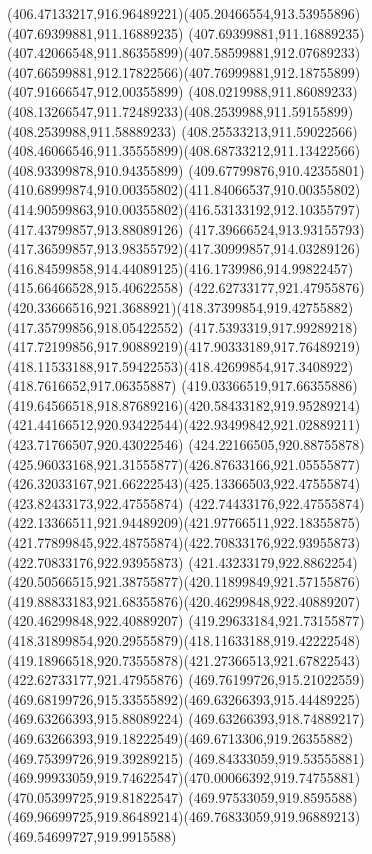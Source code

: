 {{		\curveto(406.47133217,916.96489221)(405.20466554,913.53955896)(407.69399881,911.16889235)
		\curveto(407.69399881,911.16889235)(407.42066548,911.86355899)(407.58599881,912.07689233)
		\curveto(407.66599881,912.17822566)(407.76999881,912.18755899)(407.91666547,912.00355899)
		\curveto(408.0219988,911.86089233)(408.13266547,911.72489233)(408.2539988,911.59155899)
		\lineto(408.2539988,911.58889233)
		\lineto(408.25533213,911.59022566)
		\curveto(408.46066546,911.35555899)(408.68733212,911.13422566)(408.93399878,910.94355899)
		\curveto(409.67799876,910.42355801)(410.68999874,910.00355802)(411.84066537,910.00355802)
		\curveto(414.90599863,910.00355802)(416.53133192,912.10355797)(417.43799857,913.88089126)
		\curveto(417.39666524,913.93155793)(417.36599857,913.98355792)(417.30999857,914.03289126)
		\curveto(416.84599858,914.44089125)(416.1739986,914.99822457)(415.66466528,915.40622558)
		\moveto(422.62733177,921.47955876)
		\curveto(420.33666516,921.3688921)(418.37399854,919.42755882)(417.35799856,918.05422552)
		\curveto(417.5393319,917.99289218)(417.72199856,917.90889219)(417.90333189,917.76489219)
		\curveto(418.11533188,917.59422553)(418.42699854,917.3408922)(418.7616652,917.06355887)
		\curveto(419.03366519,917.66355886)(419.64566518,918.87689216)(420.58433182,919.95289214)
		\curveto(421.44166512,920.93422544)(422.93499842,921.02889211)(423.71766507,920.43022546)
		\curveto(424.22166505,920.88755878)(425.96033168,921.31555877)(426.87633166,921.05555877)
		\curveto(426.32033167,921.66222543)(425.13366503,922.47555874)(423.82433173,922.47555874)
		\curveto(422.74433176,922.47555874)(422.13366511,921.94489209)(421.97766511,922.18355875)
		\curveto(421.77899845,922.48755874)(422.70833176,922.93955873)(422.70833176,922.93955873)
		\curveto(421.43233179,922.8862254)(420.50566515,921.38755877)(420.11899849,921.57155876)
		\curveto(419.88833183,921.68355876)(420.46299848,922.40889207)(420.46299848,922.40889207)
		\curveto(419.29633184,921.73155877)(418.31899854,920.29555879)(418.11633188,919.42222548)
		\curveto(419.18966518,920.73555878)(421.27366513,921.67822543)(422.62733177,921.47955876)
		\moveto(469.76199726,915.21022559)
		\curveto(469.68199726,915.33555892)(469.63266393,915.44489225)(469.63266393,915.88089224)
		\lineto(469.63266393,918.74889217)
		\curveto(469.63266393,919.18222549)(469.6713306,919.26355882)(469.75399726,919.39289215)
		\curveto(469.84333059,919.53555881)(469.99933059,919.74622547)(470.00066392,919.74755881)
		\lineto(470.05399725,919.81822547)
		\lineto(469.97533059,919.8595588)
		\curveto(469.96699725,919.86489214)(469.76833059,919.96889213)(469.54699727,919.9915588)
}}
